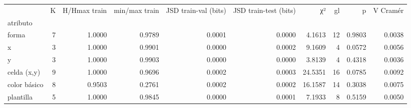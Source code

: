 \begin{tabular}{lrrrrrrrrr}
\toprule
 & K & H/Hmax train & min/max train & JSD train-val (bits) & JSD train-test (bits) & χ² & gl & p & V Cramér \\
atributo &  &  &  &  &  &  &  &  &  \\
\midrule
forma & 7 & 1.0000 & 0.9789 & 0.0001 & 0.0000 & 4.1613 & 12 & 0.9803 & 0.0038 \\
x & 3 & 1.0000 & 0.9901 & 0.0000 & 0.0002 & 9.1609 & 4 & 0.0572 & 0.0056 \\
y & 3 & 1.0000 & 0.9903 & 0.0000 & 0.0000 & 3.8139 & 4 & 0.4318 & 0.0036 \\
celda (x,y) & 9 & 1.0000 & 0.9696 & 0.0002 & 0.0003 & 24.5351 & 16 & 0.0785 & 0.0092 \\
color básico & 8 & 0.9503 & 0.2761 & 0.0002 & 0.0002 & 16.1587 & 14 & 0.3038 & 0.0075 \\
plantilla & 5 & 1.0000 & 0.9845 & 0.0000 & 0.0001 & 7.1933 & 8 & 0.5159 & 0.0050 \\
\bottomrule
\end{tabular}
